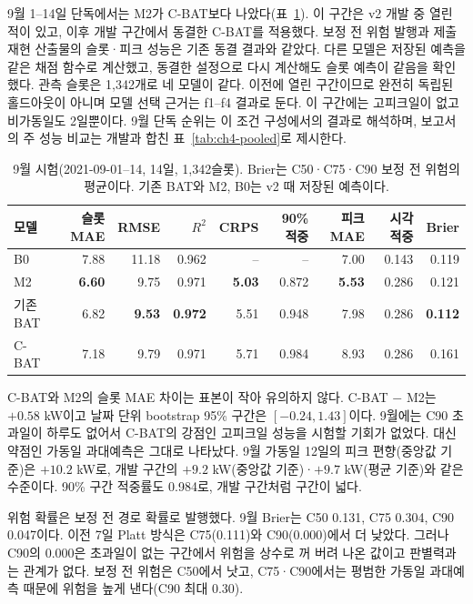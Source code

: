 9월 1--14일 단독에서는 M2가 C-BAT보다 나았다(표~\ref{tab:ch4-sept}). 이 구간은 v2 개발 중 열린 적이 있고, 이후 개발 구간에서 동결한 C-BAT를 적용했다. 보정 전 위험 발행과 제출 재현 산출물의 슬롯·피크 성능은 기존 동결 결과와 같았다. 다른 모델은 저장된 예측을 같은 채점 함수로 계산했고, 동결한 설정으로 다시 계산해도 슬롯 예측이 같음을 확인했다. 관측 슬롯은 1,342개로 네 모델이 같다. 이전에 열린 구간이므로 완전히 독립된 홀드아웃이 아니며 모델 선택 근거는 f1--f4 결과로 둔다. 이 구간에는 고피크일이 없고 비가동일도 2일뿐이다. 9월 단독 순위는 이 조건 구성에서의 결과로 해석하며, 보고서의 주 성능 비교는 개발과 합친 표~\ref{tab:ch4-pooled}로 제시한다.

\begin{table}[htbp]
\centering
\caption{9월 시험(2021-09-01--14, 14일, 1,342슬롯). Brier는 C50·C75·C90 보정 전 위험의 평균이다. 기존 BAT와 M2, B0는 v2 때 저장된 예측이다.}
\label{tab:ch4-sept}
\small
\setlength{\tabcolsep}{4pt}
\begin{tabular}{lrrrrrrrr}
\toprule
모델 & 슬롯 MAE & RMSE & $R^2$ & CRPS & 90\% 적중 & 피크 MAE & 시각 적중 & Brier \\
\midrule
B0 & 7.88 & 11.18 & 0.962 & -- & -- & 7.00 & 0.143 & 0.119 \\
M2 & \textbf{6.60} & 9.75 & 0.971 & \textbf{5.03} & 0.872 & \textbf{5.53} & 0.286 & 0.121 \\
기존 BAT & 6.82 & \textbf{9.53} & \textbf{0.972} & 5.51 & 0.948 & 7.98 & 0.286 & \textbf{0.112} \\
C-BAT & 7.18 & 9.79 & 0.971 & 5.71 & 0.984 & 8.93 & 0.286 & 0.161 \\
\bottomrule
\end{tabular}
\end{table}

C-BAT와 M2의 슬롯 MAE 차이는 표본이 작아 유의하지 않다. C-BAT $-$ M2는 $+0.58$ kW이고 날짜 단위 bootstrap 95\% 구간은 $[-0.24, 1.43]$이다. 9월에는 C90 초과일이 하루도 없어서 C-BAT의 강점인 고피크일 성능을 시험할 기회가 없었다. 대신 약점인 가동일 과대예측은 그대로 나타났다. 9월 가동일 12일의 피크 편향(중앙값 기준)은 $+10.2$ kW로, 개발 구간의 $+9.2$ kW(중앙값 기준)·$+9.7$ kW(평균 기준)와 같은 수준이다. 90\% 구간 적중률도 0.984로, 개발 구간처럼 구간이 넓다.

위험 확률은 보정 전 경로 확률로 발행했다. 9월 Brier는 C50 0.131, C75 0.304, C90 0.047이다. 이전 7일 Platt 방식은 C75(0.111)와 C90(0.000)에서 더 낮았다. 그러나 C90의 0.000은 초과일이 없는 구간에서 위험을 상수로 꺼 버려 나온 값이고 판별력과는 관계가 없다. 보정 전 위험은 C50에서 낫고, C75·C90에서는 평범한 가동일 과대예측 때문에 위험을 높게 낸다(C90 최대 0.30).

